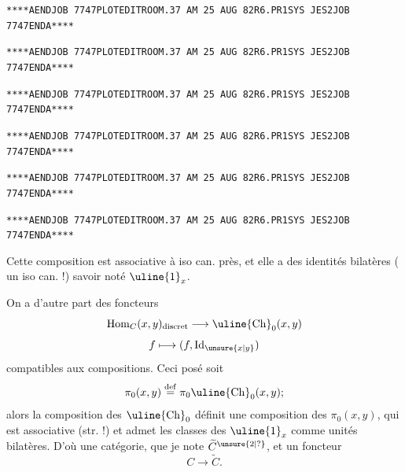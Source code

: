 \texttt{****A\quad END\quad JOB 7747\quad PLOTEDIT\qquad ROOM.37 AM 25 AUG 82\quad R6.PR1\quad SYS JES2\quad JOB 7747\quad END\quad A****}

\texttt{****A\quad END\quad JOB 7747\quad PLOTEDIT\qquad ROOM.37 AM 25 AUG 82\quad R6.PR1\quad SYS JES2\quad JOB 7747\quad END\quad A****}

\texttt{****A\quad END\quad JOB 7747\quad PLOTEDIT\qquad ROOM.37 AM 25 AUG 82\quad R6.PR1\quad SYS JES2\quad JOB 7747\quad END\quad A****}

\texttt{****A\quad END\quad JOB 7747\quad PLOTEDIT\qquad ROOM.37 AM 25 AUG 82\quad R6.PR1\quad SYS JES2\quad JOB 7747\quad END\quad A****}

\texttt{****A\quad END\quad JOB 7747\quad PLOTEDIT\qquad ROOM.37 AM 25 AUG 82\quad R6.PR1\quad SYS JES2\quad JOB 7747\quad END\quad A****}

\texttt{****A\quad END\quad JOB 7747\quad PLOTEDIT\qquad ROOM.37 AM 25 AUG 82\quad R6.PR1\quad SYS JES2\quad JOB 7747\quad END\quad A****}


Cette composition est associative à iso can. près, et elle a des identités bilatères ( un iso can. !) savoir
 noté $\uline{1}_x$.

On a d'autre part des  foncteurs
\[\operatorname{Hom}_C(x,y)_{\text{discret}}\longrightarrow\uline{\mathrm{Ch}}_0(x,y)\]
\[f\longmapsto(f,\operatorname{Id}_{\unsure{x|y}})\]
compatibles aux compositions. Ceci posé soit
\[\pi_0(x,y)\overset{\mathrm{def}}=\pi_0\uline{\mathrm{Ch}}_0(x,y);\]
alors la composition des $\uline{\mathrm{Ch}}_0$ définit une composition des $\pi_0(x,y)$, qui est associative (str. !) et admet les classes des $\uline{1}_x$ comme unités bilatères. D'où une catégorie, que je note $\widetilde C^{\unsure{2|?}}$, et un foncteur
\[C\longrightarrow\widetilde C.\]

